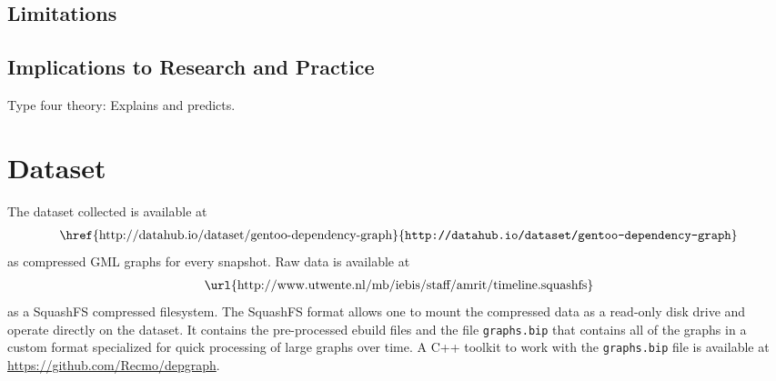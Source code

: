 \documentclass[smallextended,final]{svjour3}
\begin{document}
\subsection{Limitations}

\subsection{Implications to Research and Practice}

Type four theory: Explains and predicts.




\appendix
\section{Dataset}

The dataset collected is available at
\begin{align}
\mbox{\href{http://datahub.io/dataset/gentoo-dependency-graph}{\texttt{http://datahub.io/dataset/gentoo-dependency-graph}}}
\end{align}
as compressed GML graphs for every snapshot. Raw data is available at
\begin{align}
\mbox{\url{http://www.utwente.nl/mb/iebis/staff/amrit/timeline.squashfs}}
\end{align}
as a SquashFS compressed filesystem. The SquashFS format allows one to mount the compressed data as a read-only disk drive and operate directly on the dataset. It contains the pre-processed ebuild files and the file \verb|graphs.bip| that contains all of the graphs in a custom format specialized for quick processing of large graphs over time. A C++ toolkit to work with the \verb|graphs.bip| file is available at \url{https://github.com/Recmo/depgraph}.
\end{document}
